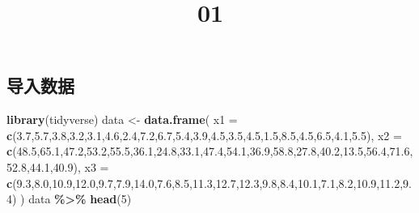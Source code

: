 \documentclass[
]{ctex}
\title{01}
\author{}
\date{\vspace{-2.5em}}
\newenvironment{Shaded}{\begin{snugshade}}{\end{snugshade}}
\newcommand{\AttributeTok}[1]{\textcolor[rgb]{0.13,0.29,0.53}{#1}}
\newcommand{\DecValTok}[1]{\textcolor[rgb]{0.00,0.00,0.81}{#1}}
\newcommand{\FloatTok}[1]{\textcolor[rgb]{0.00,0.00,0.81}{#1}}
\newcommand{\FunctionTok}[1]{\textcolor[rgb]{0.13,0.29,0.53}{\textbf{#1}}}
\newcommand{\NormalTok}[1]{#1}
\newcommand{\OtherTok}[1]{\textcolor[rgb]{0.56,0.35,0.01}{#1}}
\newcommand{\SpecialCharTok}[1]{\textcolor[rgb]{0.81,0.36,0.00}{\textbf{#1}}}
\begin{document}
\maketitle

{
\setcounter{tocdepth}{2}
\tableofcontents
}
\subsection{导入数据}\label{ux5bfcux5165ux6570ux636e}

\begin{Shaded}
\begin{Highlighting}[]
\FunctionTok{library}\NormalTok{(tidyverse)}
\NormalTok{data }\OtherTok{\textless{}{-}} \FunctionTok{data.frame}\NormalTok{(}
  \AttributeTok{x1 =} \FunctionTok{c}\NormalTok{(}\FloatTok{3.7}\NormalTok{,}\FloatTok{5.7}\NormalTok{,}\FloatTok{3.8}\NormalTok{,}\FloatTok{3.2}\NormalTok{,}\FloatTok{3.1}\NormalTok{,}\FloatTok{4.6}\NormalTok{,}\FloatTok{2.4}\NormalTok{,}\FloatTok{7.2}\NormalTok{,}\FloatTok{6.7}\NormalTok{,}\FloatTok{5.4}\NormalTok{,}\FloatTok{3.9}\NormalTok{,}\FloatTok{4.5}\NormalTok{,}\FloatTok{3.5}\NormalTok{,}\FloatTok{4.5}\NormalTok{,}\FloatTok{1.5}\NormalTok{,}\FloatTok{8.5}\NormalTok{,}\FloatTok{4.5}\NormalTok{,}\FloatTok{6.5}\NormalTok{,}\FloatTok{4.1}\NormalTok{,}\FloatTok{5.5}\NormalTok{),}
  \AttributeTok{x2 =} \FunctionTok{c}\NormalTok{(}\FloatTok{48.5}\NormalTok{,}\FloatTok{65.1}\NormalTok{,}\FloatTok{47.2}\NormalTok{,}\FloatTok{53.2}\NormalTok{,}\FloatTok{55.5}\NormalTok{,}\FloatTok{36.1}\NormalTok{,}\FloatTok{24.8}\NormalTok{,}\FloatTok{33.1}\NormalTok{,}\FloatTok{47.4}\NormalTok{,}\FloatTok{54.1}\NormalTok{,}\FloatTok{36.9}\NormalTok{,}\FloatTok{58.8}\NormalTok{,}\FloatTok{27.8}\NormalTok{,}\FloatTok{40.2}\NormalTok{,}\FloatTok{13.5}\NormalTok{,}\FloatTok{56.4}\NormalTok{,}\FloatTok{71.6}\NormalTok{,}\FloatTok{52.8}\NormalTok{,}\FloatTok{44.1}\NormalTok{,}\FloatTok{40.9}\NormalTok{),}
  \AttributeTok{x3 =} \FunctionTok{c}\NormalTok{(}\FloatTok{9.3}\NormalTok{,}\FloatTok{8.0}\NormalTok{,}\FloatTok{10.9}\NormalTok{,}\FloatTok{12.0}\NormalTok{,}\FloatTok{9.7}\NormalTok{,}\FloatTok{7.9}\NormalTok{,}\FloatTok{14.0}\NormalTok{,}\FloatTok{7.6}\NormalTok{,}\FloatTok{8.5}\NormalTok{,}\FloatTok{11.3}\NormalTok{,}\FloatTok{12.7}\NormalTok{,}\FloatTok{12.3}\NormalTok{,}\FloatTok{9.8}\NormalTok{,}\FloatTok{8.4}\NormalTok{,}\FloatTok{10.1}\NormalTok{,}\FloatTok{7.1}\NormalTok{,}\FloatTok{8.2}\NormalTok{,}\FloatTok{10.9}\NormalTok{,}\FloatTok{11.2}\NormalTok{,}\FloatTok{9.4}\NormalTok{)}
\NormalTok{)}
\NormalTok{data }\SpecialCharTok{\%\textgreater{}\%} \FunctionTok{head}\NormalTok{(}\DecValTok{5}\NormalTok{)}
\end{Highlighting}
\end{Shaded}
\end{document}
